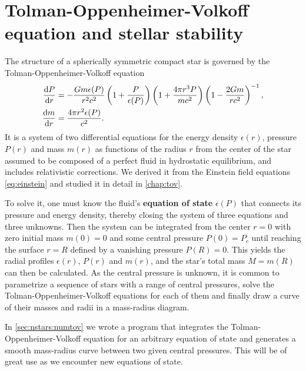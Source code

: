 
\section{Tolman-Oppenheimer-Volkoff equation and stellar stability}

The structure of a spherically symmetric compact star is governed by the Tolman-Oppenheimer-Volkoff equation
\begin{subequations}
\begin{align}
	\odv{P}{r} &= -\frac{G m \epsilon(P)}{r^2 c^2} \left( 1 + \frac{P}{\epsilon(P)} \right) \left( 1 + \frac{4 \pi r^3 P}{m c^2} \right) \left( 1 - \frac{2 G m}{r c^2} \right)^{-1} , \\
	\odv{m}{r} &= \frac{4 \pi r^2 \epsilon(P)}{c^2} .
\end{align}
\label{eq:master_intro:tov}
\end{subequations}
It is a system of two differential equations for the energy density $\epsilon(r)$, pressure $P(r)$ and mass $m(r)$ as functions of the radius $r$ from the center of the star assumed to be composed of a perfect fluid in hydrostatic equilibrium, and includes relativistic corrections.
We derived it from the Einstein field equations \eqref{eq:einstein} and studied it in detail in \cref{chap:tov}.

To solve it, one must know the fluid's \textbf{equation of state} $\epsilon(P)$ that connects its pressure and energy density, thereby closing the system of three equations and three unknowns.
Then the system can be integrated from the center $r=0$ with zero initial mass $m(0) = 0$ and some central pressure $P(0) = P_c$ until reaching the surface $r=R$ defined by a vanishing pressure $P(R) = 0$.
This yields the radial profiles $\epsilon(r)$, $P(r)$ and $m(r)$, and the star's total mass $M = m(R)$ can then be calculated.
As the central pressure is unknown, it is common to parametrize a sequence of stars with a range of central pressures, solve the Tolman-Oppenheimer-Volkoff equations for each of them and finally draw a curve of their masses and radii in a mass-radius diagram.

In \cref{sec:nstars:numtov} we wrote a program that integrates the Tolman-Oppenheimer-Volkoff equation for an arbitrary equation of state and generates a smooth mass-radius curve between two given central pressures.
This will be of great use as we encounter new equations of state.

